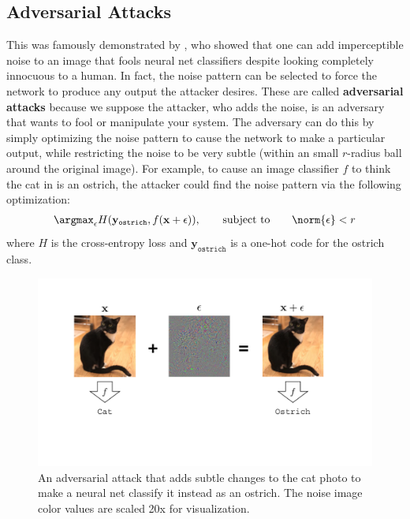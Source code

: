 \subsection{Adversarial Attacks}\label{sec:bias_and_shift:adversarial_attacks}

This was famously demonstrated by \cite{szegedy2014intriguing}, who showed that one can add imperceptible noise to an image that fools neural net classifiers despite looking completely innocuous to a human. In fact, the noise pattern can be selected to force the network to produce any output the attacker desires. These are called {\bf adversarial attacks} because we suppose the attacker, who adds the noise, is an adversary that wants to fool or manipulate your system. The adversary can do this by simply optimizing the noise pattern to cause the network to make a particular output, while restricting the noise to be very subtle (within an small $r$-radius ball around the original image). For example, to cause an image classifier $f$ to think the cat in \fig{\ref{fig:bias_and_shift:adversarial_perturbation}} is an ostrich, the attacker could find the noise pattern via the following optimization:
\begin{align}
    \argmax_{\mathbf{\epsilon}} H(\mathbf{y}_{\texttt{ostrich}}, f(\mathbf{x} + \mathbf{\epsilon})), \quad\quad \text{subject to} \quad\quad \norm{\mathbf{\epsilon}} < r
\end{align}
where $H$ is the cross-entropy loss and $\mathbf{y}_{\texttt{ostrich}}$ is a one-hot code for the ostrich class.

\begin{figure}[t]
    \centerline{
    \includegraphics[width=0.8\linewidth]{./figures/bias_and_shift/adversarial_perturbation_3.pdf}
    }
    \caption{An adversarial attack that adds subtle changes to the cat photo to make a neural net classify it instead as an ostrich. The noise image color values are scaled 20x for visualization.}
    \label{fig:bias_and_shift:adversarial_perturbation}
\end{figure}

